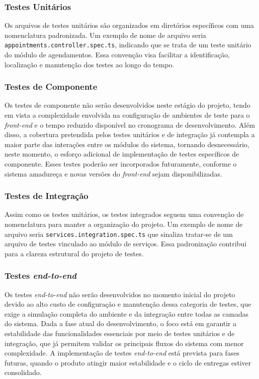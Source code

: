 \subsubsection{Testes Unitários}
Os arquivos de testes unitários são organizados em diretórios específicos com uma nomenclatura padronizada. Um exemplo de nome de arquivo seria \texttt{appointments.\allowbreak controller.\allowbreak spec.ts}, indicando que se trata de um teste unitário do módulo de agendamentos. Essa convenção visa facilitar a identificação, localização e manutenção dos testes ao longo do tempo.

\subsubsection{Testes de Componente}
Os testes de componente não serão desenvolvidos neste estágio do projeto, 
tendo em vista a complexidade envolvida na configuração de ambientes de teste para o \textit{front-end} e o tempo reduzido disponível no cronograma de desenvolvimento.
Além disso, a cobertura pretendida pelos testes unitários e de integração já contempla a maior parte das interações entre os módulos do sistema, 
tornando desnecessário, neste momento, o esforço adicional de implementação de testes específicos de componente. 
Esses testes poderão ser incorporados futuramente, conforme o sistema amadureça e novas versões do \textit{front-end} sejam disponibilizadas.

\subsubsection{Testes de Integração}
Assim como os testes unitários, os testes integrados seguem uma convenção de nomenclatura para manter a organização do projeto. Um exemplo de nome de arquivo seria \texttt{services.\allowbreak integration.\allowbreak spec.ts} que sinaliza tratar-se de um arquivo de testes vinculado ao módulo de serviços. Essa padronização contribui para a clareza estrutural do projeto de testes.

\subsubsection{Testes \textit{end-to-end}}
Os testes \textit{end-to-end} não serão desenvolvidos no momento inicial do projeto devido ao alto custo de configuração e manutenção dessa categoria de testes, 
que exige a simulação completa do ambiente e da integração entre todas as camadas do sistema. 
Dada a fase atual do desenvolvimento, o foco está em garantir a estabilidade das funcionalidades essenciais por meio de testes unitários e de integração, 
que já permitem validar os principais fluxos do sistema com menor complexidade. 
A implementação de testes \textit{end-to-end} está prevista para fases futuras, quando o produto atingir maior estabilidade e o ciclo de entregas estiver consolidado.

